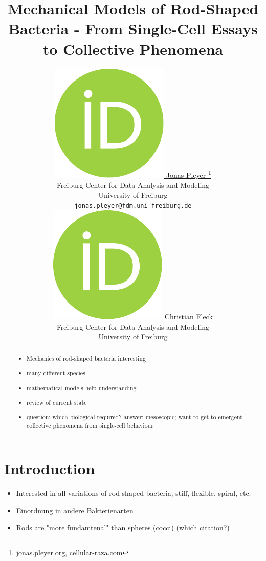 \documentclass{article}
\title{Mechanical Models of Rod-Shaped Bacteria - From Single-Cell Essays to Collective Phenomena}
\author{
    \href{https://orcid.org/0009-0001-0613-7978}{
        \includegraphics[scale=0.06]{orcid.pdf}
        \hspace{1mm}Jonas Pleyer
    }
    \thanks{
        \href{https://jonas.pleyer.org}{jonas.pleyer.org},
        \href{https://cellular-raza.com}{cellular-raza.com}
    }\\
	Freiburg Center for Data-Analysis and Modeling\\
	University of Freiburg\\
	\texttt{jonas.pleyer@fdm.uni-freiburg.de} \\
	\And
	\href{https://orcid.org/0000-0002-6371-4495}{
        \includegraphics[scale=0.06]{orcid.pdf}
        \hspace{1mm}Christian Fleck
    }\\
	Freiburg Center for Data-Analysis and Modeling\\
	University of Freiburg
}
\begin{document}
\maketitle


\begin{abstract}
    \begin{itemize}
        \item Mechanics of rod-shaped bacteria interesting
        \item many different species
        \item mathematical models help understanding
        \item review of current state
        \item question; which biological required? answer: mesoscopic; want to get to emergent
            collective phenomena from single-cell behaviour
    \end{itemize}
\end{abstract}



\tableofcontents

\section{Introduction}

\begin{itemize}
    \item Interested in all variations of rod-shaped bacteria; stiff, flexible, spiral, etc.
    \item Einordnung in andere Bakterienarten
    \item Rods are "more fundamtenal" than spheres (cocci) (which citation?)
\end{itemize}
\end{document}
